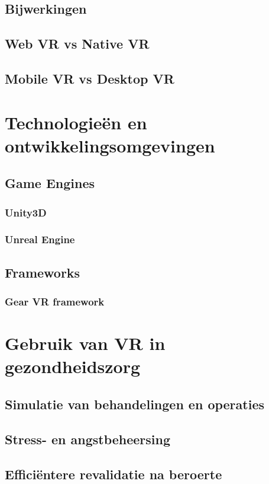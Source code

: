 \subsection{Bijwerkingen}
\subsection{Web VR vs Native VR}
\subsection{Mobile VR vs Desktop VR}

\section{Technologieën en ontwikkelingsomgevingen}
\subsection{Game Engines}
\subsubsection{Unity3D}
\subsubsection{Unreal Engine}
\subsection{Frameworks}
\subsubsection{Gear VR framework}

\section{Gebruik van VR in gezondheidszorg}
\subsection{Simulatie van behandelingen en operaties}
\subsection{Stress- en angstbeheersing}  
\subsection{Efficiëntere revalidatie na beroerte}  

